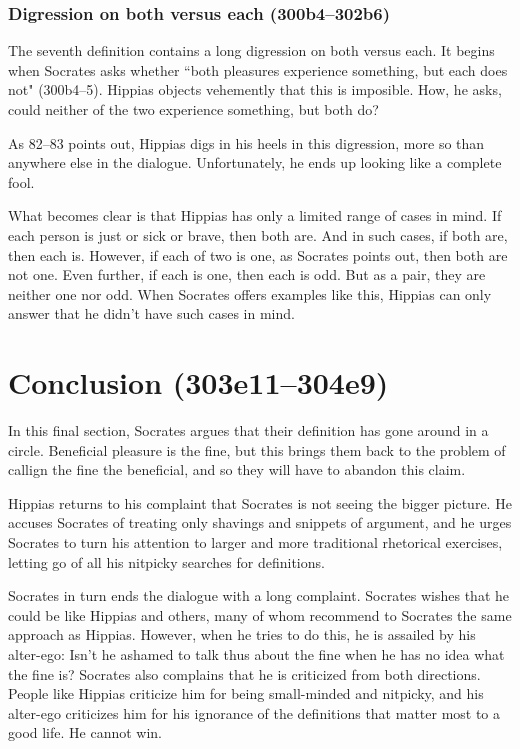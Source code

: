 \documentclass[11pt]{article}
\begin{document}

\subsubsection{Digression on both versus each (300b4--302b6)}

The seventh definition contains a long digression on both versus each.  It
begins when Socrates asks whether ``both pleasures experience something, but
each does not" (300b4--5).  Hippias objects vehemently that this is imposible.
How, he asks, could neither of the two experience something, but both do?

As \citet{woodruff1982} 82--83 points out, Hippias digs in his heels in this
digression, more so than anywhere else in the dialogue.  Unfortunately, he ends
up looking like a complete fool.

What becomes clear is that Hippias has only a limited range of cases in mind.
If each person is just or sick or brave, then both are.  And in such cases, if
both are, then each is.  However, if each of two is one, as Socrates points
out, then both are not one.  Even further, if each is one, then each is odd.
But as a pair, they are neither one nor odd.  When Socrates offers examples
like this, Hippias can only answer that he didn't have such cases in mind.


\section{Conclusion (303e11--304e9)}

In this final section, Socrates argues that their definition has gone around in
a circle.  Beneficial pleasure is the fine, but this brings them back to the
problem of callign the fine the beneficial, and so they will have to abandon
this claim.

Hippias returns to his complaint that Socrates is not seeing the bigger
picture.  He accuses Socrates of treating only shavings and snippets of
argument, and he urges Socrates to turn his attention to larger and more
traditional rhetorical exercises, letting go of all his nitpicky searches for
definitions.

Socrates in turn ends the dialogue with a long complaint.  Socrates wishes that
he could be like Hippias and others, many of whom recommend to Socrates the
same approach as Hippias.  However, when he tries to do this, he is assailed by
his alter-ego: Isn't he ashamed to talk thus about the fine when he has no idea
what the fine is?  Socrates also complains that he is criticized from both
directions.  People like Hippias criticize him for being small-minded and
nitpicky, and his alter-ego criticizes him for his ignorance of the definitions
that matter most to a good life.  He cannot win.
\end{document}
